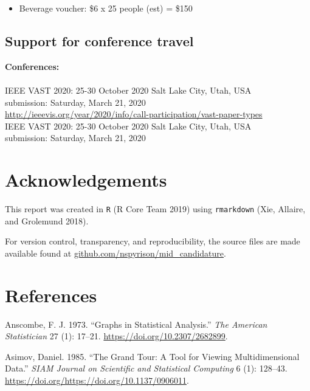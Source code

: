 \documentclass[
  11,
]{article}
\providecommand{\tightlist}{%
  \setlength{\itemsep}{0pt}\setlength{\parskip}{0pt}}
\begin{document}
\begin{itemize}
\tightlist
\item
  Beverage voucher: \$6 x 25 people (est) = \$150
\end{itemize}

\hypertarget{support-for-conference-travel}{%
\subsection{Support for conference travel}\label{support-for-conference-travel}}

\textbf{Conferences:}\\
~\\
IEEE VAST 2020: 25-30 October 2020 Salt Lake City, Utah, USA\\
submission: Saturday, March 21, 2020\\
\url{http://ieeevis.org/year/2020/info/call-participation/vast-paper-types}~\\
IEEE VAST 2020: 25-30 October 2020 Salt Lake City, Utah, USA\\
submission: Saturday, March 21, 2020\\

\hypertarget{sec:acknowledgements}{%
\section{Acknowledgements}\label{sec:acknowledgements}}

This report was created in \texttt{R} (R Core Team 2019) using \texttt{rmarkdown} (Xie, Allaire, and Grolemund 2018).

For version control, transparency, and reproducibility, the source files are made available found at \href{https://github.com/nspyrison/mid_candidature}{github.com/nspyrison/mid\_candidature}.

\hypertarget{references}{%
\section*{References}\label{references}}

\hypertarget{refs}{}
\leavevmode\hypertarget{ref-anscombe_graphs_1973}{}%
Anscombe, F. J. 1973. ``Graphs in Statistical Analysis.'' \emph{The American Statistician} 27 (1): 17--21. \url{https://doi.org/10.2307/2682899}.

\leavevmode\hypertarget{ref-asimov_grand_1985}{}%
Asimov, Daniel. 1985. ``The Grand Tour: A Tool for Viewing Multidimensional Data.'' \emph{SIAM Journal on Scientific and Statistical Computing} 6 (1): 128--43. \url{https://doi.org/https://doi.org/10.1137/0906011}.
\end{document}
